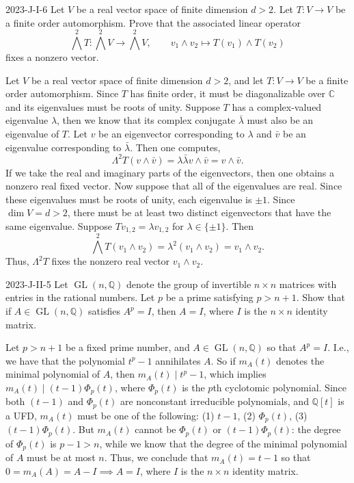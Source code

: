 \documentclass{article}
\begin{document}
	\begin{prb}{2023-J-I-6}
		Let $V$ be a real vector space of finite dimension $d > 2$. Let $T: V \to V$ be a finite order automorphism. Prove that the associated linear operator 
		\begin{equation*}
			\bigwedge^{2}T: \bigwedge^{2}V \to \bigwedge^{2}V, \qquad v_1 \wedge v_2 \mapsto T(v_1) \wedge T(v_2)
		\end{equation*}
		fixes a nonzero vector. 
	\end{prb}
	Let $V$ be a real vector space of finite dimension $d > 2$, and let $T: V \to V$ be a finite order automorphism. Since $T$ has finite order, it must be diagonalizable over $\mathbb{C}$ and its eigenvalues must be roots of unity. Suppose $T$ has a complex-valued eigenvalue $\lambda$, then we know that its complex conjugate $\bar{\lambda}$ must also be an eigenvalue of $T$. Let $v$ be an eigenvector corresponding to $\lambda$ and $\bar{v}$ be an eigenvalue corresponding to $\bar{\lambda}$. Then one computes, 
	\begin{equation*}
		\Lambda^{2}T(v \wedge \bar{v}) = \lambda \bar{\lambda}v \wedge \bar{v} = v \wedge \bar{v}. 
	\end{equation*}
	If we take the real and imaginary parts of the eigenvectors, then one obtains a nonzero real fixed vector. Now suppose that all of the eigenvalues are real. Since these eigenvalues must be roots of unity, each eigenvalue is $\pm 1$. Since $\dim{V} = d > 2$, there must be at least two distinct eigenvectors that have the same eigenvalue. Suppose $Tv_{1,2} = \lambda v_{1,2}$ for $\lambda \in \{\pm1\}$. Then 
	\begin{equation*}
		\bigwedge^{2}T(v_1 \wedge v_2) = \lambda^2 (v_1 \wedge v_2) = v_1 \wedge v_2. 
	\end{equation*}
	Thus, $\Lambda^2 T$ fixes the nonzero real vector $v_1 \wedge v_2$. 
	
	\begin{prb}{2023-J-II-5}
		Let $\operatorname{GL}(n, \mathbb{Q})$ denote the group of invertible $n \times n$ matrices with entries in the rational numbers. Let $p$ be a prime satisfying $p > n + 1$. Show that if $A \in \operatorname{GL}(n,\mathbb{Q})$ satisfies $A^p = I$, then $A = I$, where $I$ is the $n \times n$ identity matrix. 
	\end{prb}
	Let $p > n + 1$ be a fixed prime number, and $A \in \operatorname{GL}(n, \mathbb{Q})$ so that $A^p = I$. I.e., we have that the polynomial $t^{p} - 1$ annihilates $A$. So if $m_{A}(t)$ denotes the minimal polynomial of $A$, then $m_{A}(t) \mid t^{p} -1$, which implies $m_{A}(t) \mid (t -1)\Phi_{p}(t)$, where $\Phi_{p}(t)$ is the $p$th cyclotomic polynomial. Since both $(t - 1)$ and $\Phi_{p}(t)$ are nonconstant irreducible polynomials, and $\mathbb{Q}[t]$ is a UFD, $m_{A}(t)$ must be one of the following: (1) $t - 1$, (2) $\Phi_{p}(t)$, (3) $(t - 1)\Phi_{p}(t)$. But $m_{A}(t)$ cannot be $\Phi_{p}(t)$ or $(t - 1)\Phi_{p}(t)$: the degree of $\Phi_{p}(t)$ is $p -1 > n$, while we know that the degree of the minimal polynomial of $A$ must be at most $n$. Thus, we conclude that $m_{A}(t) = t - 1$ so that $0 = m_{A}(A) = A - I \implies A = I$, where $I$ is the $n\times n$ identity matrix. 
	
\end{document}
